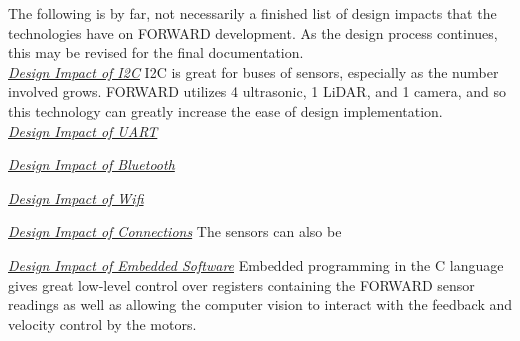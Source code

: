 \noindent The following is by far, not necessarily a finished list of design impacts that the technologies have on FORWARD development. As the design process continues, this may be revised for the final documentation.\\

\underline{\textit{Design Impact of I2C}}
I2C is great for buses of sensors, especially as the number involved grows. FORWARD utilizes 4 ultrasonic, 1 LiDAR, and 1 camera, and so this technology can greatly increase the ease of design implementation.\\

\underline{\textit{Design Impact of UART}}
	
	
\underline{\textit{Design Impact of Bluetooth}}


\underline{\textit{Design Impact of Wifi}}


\underline{\textit{Design Impact of Connections}}
The sensors can also be 

\underline{\textit{Design Impact of Embedded Software}}
Embedded programming in the C language gives great low-level control over registers containing the FORWARD sensor readings as well as allowing the computer vision to interact with the feedback and velocity control by the motors.\\

